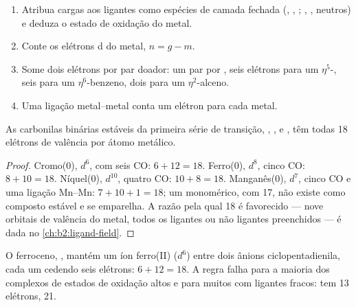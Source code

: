 \begin{method}\label{met:b2:coordination-complexes:electron-count}
\begin{enumerate}
  \item Atribua cargas aos ligantes como espécies de camada fechada (, ,
        ; , ,  neutros) e deduza o estado de
        oxidação do metal.
  \item Conte os elétrons d do metal, $n = g - m$.
  \item Some dois elétrons por par doador: um par por ,
        seis elétrons para um $\eta^5$-, seis para um $\eta^6$-benzeno,
        dois para um $\eta^2$-alceno.
  \item Uma ligação metal--metal conta um elétron para cada metal.
\end{enumerate}
\end{method}

\begin{proposition}\label{prop:b2:coordination-complexes:eighteen}
As carbonilas binárias estáveis da primeira série de transição, ,
,  e , têm todas 18 elétrons de valência
por átomo metálico.
\end{proposition}

\begin{proof}
Cromo(0), $d^6$, com seis CO: $6 + 12 = 18$. Ferro(0), $d^8$, cinco CO: $8 + 10 = 18$.
Níquel(0), $d^{10}$, quatro CO: $10 + 8 = 18$. Manganês(0), $d^7$, cinco CO e uma
ligação Mn--Mn: $7 + 10 + 1 = 18$; um  monomérico, com 17, não existe
como composto estável e se emparelha. A razão pela qual 18 é favorecido ---
nove orbitais de valência do metal, todos os ligantes ou não ligantes
preenchidos --- é dada no \cref{ch:b2:ligand-field}.
\end{proof}

O ferroceno, , mantém um íon ferro(II) ($d^6$) entre dois
ânions ciclopentadienila, cada um cedendo seis elétrons: $6 + 12 = 18$. A regra
falha para a maioria dos complexos de estados de oxidação altos e para muitos
com ligantes fracos:  tem 13 elétrons,  21.

